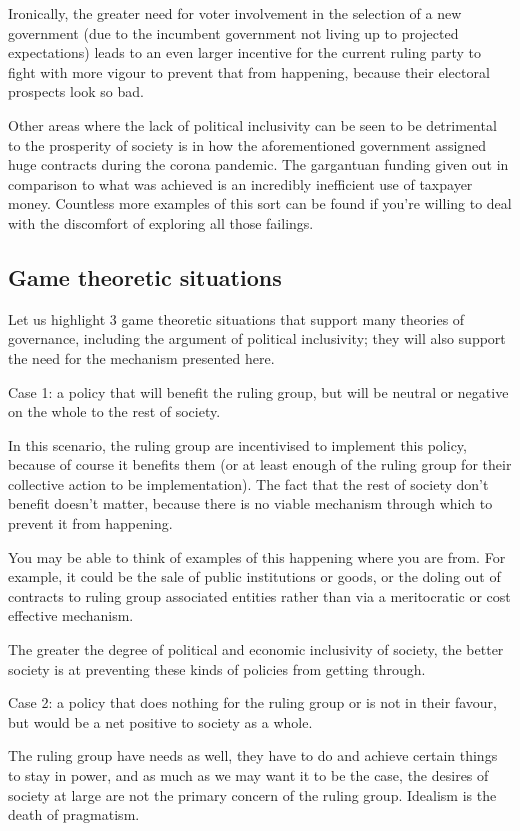 \documentclass[twoside]{article}
\theoremstyle{definition}
\begin{document}
Ironically, the greater need for voter involvement in the selection of a new government (due to the incumbent government not living up to projected expectations) leads to an even larger incentive for the current ruling party to fight with more vigour to prevent that from happening, because their electoral prospects look so bad.

Other areas where the lack of political inclusivity can be seen to be detrimental to the prosperity of society is in how the aforementioned government assigned huge contracts during the corona pandemic. The gargantuan funding given out in comparison to what was achieved is an incredibly inefficient use of taxpayer money. Countless more examples of this sort can be found if you’re willing to deal with the discomfort of exploring all those failings.

\subsection{Game theoretic situations}

Let us highlight 3 game theoretic situations that support many theories of governance, including the argument of political inclusivity; they will also support the need for the mechanism presented here.

Case 1: a policy that will benefit the ruling group, but will be neutral or negative on the whole to the rest of society.

In this scenario, the ruling group are incentivised to implement this policy, because of course it benefits them (or at least enough of the ruling group for their collective action to be implementation). The fact that the rest of society don’t benefit doesn’t matter, because there is no viable mechanism through which to prevent it from happening.

You may be able to think of examples of this happening where you are from. For example, it could be the sale of public institutions or goods, or the doling out of contracts to ruling group associated entities rather than via a meritocratic or cost effective mechanism.

The greater the degree of political and economic inclusivity of society, the better society is at preventing these kinds of policies from getting through.

Case 2: a policy that does nothing for the ruling group or is not in their favour, but would be a net positive to society as a whole.

The ruling group have needs as well, they have to do and achieve certain things to stay in power, and as much as we may want it to be the case, the desires of society at large are not the primary concern of the ruling group. Idealism is the death of pragmatism.
\end{document}
